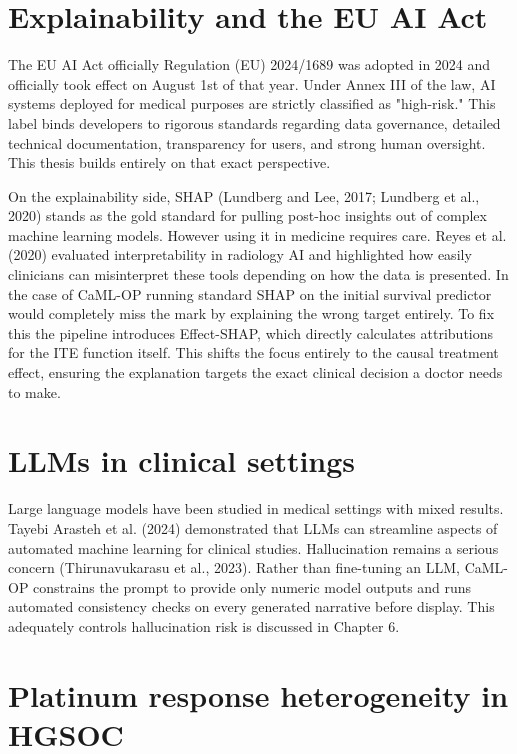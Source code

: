 \section{Explainability and the EU AI Act}\label{explainability-and-the-eu-ai-act}

The EU AI Act officially Regulation (EU) 2024/1689 was adopted in 2024 and officially took effect on August 1st of that year. Under Annex III of the law, AI systems deployed for medical purposes are strictly classified as "high-risk." This label binds developers to rigorous standards regarding data governance, detailed technical documentation, transparency for users, and strong human oversight. This thesis builds entirely on that exact perspective.

On the explainability side, SHAP (Lundberg and Lee, 2017; Lundberg et al., 2020) stands as the gold standard for pulling post-hoc insights out of complex machine learning models. However using it in medicine requires care. Reyes et al. (2020) evaluated interpretability in radiology AI and highlighted how easily clinicians can misinterpret these tools depending on how the data is presented. In the case of CaML-OP running standard SHAP on the initial survival predictor would completely miss the mark by explaining the wrong target entirely. To fix this the pipeline introduces Effect-SHAP, which directly calculates attributions for the ITE function itself. This shifts the focus entirely to the causal treatment effect, ensuring the explanation targets the exact clinical decision a doctor needs to make.

\section{LLMs in clinical settings}\label{llms-in-clinical-settings}

Large language models have been studied in medical settings with mixed results. Tayebi Arasteh et al. (2024) demonstrated that LLMs can streamline aspects of automated machine learning for clinical studies. Hallucination remains a serious concern (Thirunavukarasu et al., 2023). Rather than fine-tuning an LLM, CaML-OP constrains the prompt to provide only numeric model outputs and runs automated consistency checks on every generated narrative before display. This adequately controls hallucination risk is discussed in Chapter 6.

\section{Platinum response heterogeneity in HGSOC}\label{platinum-response-heterogeneity-in-hgsoc}

